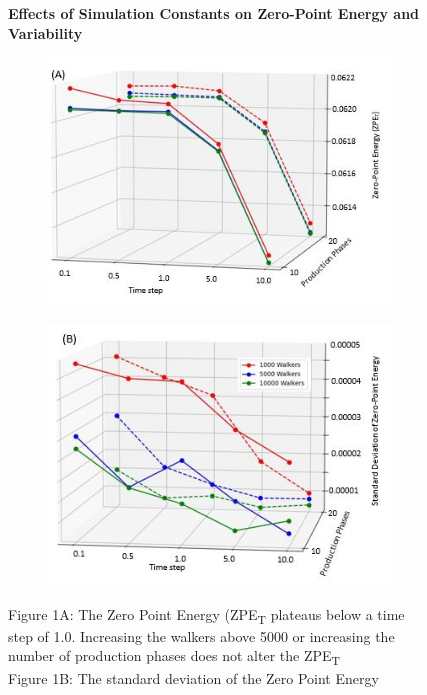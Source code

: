 \documentclass[journal=jacsat,manuscript=article]{achemso}
\newcommand*{\figuretitle}[1]{%
    {\centering%
    \textbf{#1}%
    \par\medskip}%
}
\begin{document}
\begin{figure}
\centering
\figuretitle{Effects of Simulation Constants on Zero-Point Energy and Variability}
\begin{subfigure}{.5\textwidth}
  \centering
  \includegraphics[width=\linewidth]{fig_1A.jpg}
\end{subfigure}%
\begin{subfigure}{.5\textwidth}
  \centering
  \includegraphics[width=\linewidth]{fig_1B}
\end{subfigure}
\caption{Figure 1A: The Zero Point Energy (ZPE\textsubscript{T} plateaus below a time step of 1.0. Increasing the walkers above 5000 or increasing the number of production phases does not alter the ZPE\textsubscript{T}\\ 
Figure 1B: The standard deviation of the Zero Point Energy}
\end{figure}
\end{document}
